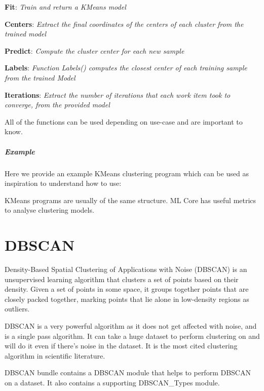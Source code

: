 \textbf{Fit}: \textit{Train and return a KMeans model}

\textbf{Centers}: \textit{Extract the final coordinates of the centers of each cluster from the trained model}

\textbf{Predict}: \textit{Compute the cluster center for each new sample}

\textbf{Labels}: \textit{Function Labels() computes the closest center of each training sample from the trained Model}

\textbf{Iterations}: \textit{Extract the number of iterations that each work item took to converge, from the provided model}

All of the functions can be used depending on use-case and are important to know.

\pagebreak

\paragraph{Example}

Here we provide an example KMeans clustering program which can be used as inspiration to understand how to use:



KMeans programs are usually of the same structure. ML Core has useful metrics to analyse clustering models.

\chapter{DBSCAN}\label{unsupe:dbscan}

Density-Based Spatial Clustering of Applications with Noise (DBSCAN) is an unsupervised learning algorithm that clusters a set of points based on their density. Given a set of points in some space, it groups together points that are closely packed together, marking points that lie alone in low-density regions as outliers. 

DBSCAN is a very powerful algorithm as it does not get affected with noise, and is a single pass algorithm. It can take a huge dataset to perform clustering on and will do it even if there's noise in the dataset. It is the most cited clustering algorithm in scientific literature.

DBSCAN bundle contains a DBSCAN module that helps to perform DBSCAN on a dataset. It also contains a supporting DBSCAN\_Types module.

